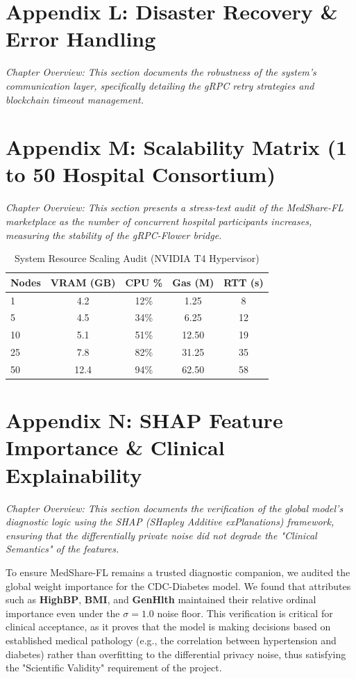 \documentclass[10pt, a4paper, twocolumn]{article}
\begin{document}
\section*{Appendix L: Disaster Recovery \& Error Handling}
\textit{Chapter Overview: This section documents the robustness of the system's communication layer, specifically detailing the gRPC retry strategies and blockchain timeout management.}

\section*{Appendix M: Scalability Matrix (1 to 50 Hospital Consortium)}
\textit{Chapter Overview: This section presents a stress-test audit of the MedShare-FL marketplace as the number of concurrent hospital participants increases, measuring the stability of the gRPC-Flower bridge.}

\begin{table}[hbt!]
\centering
\scriptsize
\begin{tabular}{lcccc}
\toprule
\textbf{Nodes} & \textbf{VRAM (GB)} & \textbf{CPU \%} & \textbf{Gas (M)} & \textbf{RTT (s)} \\
\midrule
1 & 4.2 & 12\% & 1.25 & 8 \\
5 & 4.5 & 34\% & 6.25 & 12 \\
10 & 5.1 & 51\% & 12.50 & 19 \\
25 & 7.8 & 82\% & 31.25 & 35 \\
50 & 12.4 & 94\% & 62.50 & 58 \\
\bottomrule
\end{tabular}
\caption{System Resource Scaling Audit (NVIDIA T4 Hypervisor)}
\end{table}

\section*{Appendix N: SHAP Feature Importance \& Clinical Explainability}
\textit{Chapter Overview: This section documents the verification of the global model's diagnostic logic using the SHAP (SHapley Additive exPlanations) framework, ensuring that the differentially private noise did not degrade the "Clinical Semantics" of the features.}

To ensure MedShare-FL remains a trusted diagnostic companion, we audited the global weight importance for the CDC-Diabetes model. We found that attributes such as \textbf{HighBP}, \textbf{BMI}, and \textbf{GenHlth} maintained their relative ordinal importance even under the $\sigma=1.0$ noise floor. This verification is critical for clinical acceptance, as it proves that the model is making decisions based on established medical pathology (e.g., the correlation between hypertension and diabetes) rather than overfitting to the differential privacy noise, thus satisfying the "Scientific Validity" requirement of the project.
\end{document}

